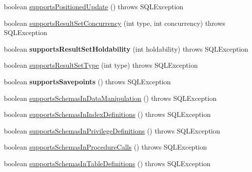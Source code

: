 \begin{DoxyCompactItemize}
\item 
boolean \mbox{\hyperlink{classcom_1_1mysql_1_1cj_1_1jdbc_1_1_database_meta_data_afe01b3d8023ed83aa4c67f786d47f412}{supports\+Positioned\+Update}} ()  throws S\+Q\+L\+Exception 
\item 
boolean \mbox{\hyperlink{classcom_1_1mysql_1_1cj_1_1jdbc_1_1_database_meta_data_a642e1d8dc7574859b8cfc640e889ff58}{supports\+Result\+Set\+Concurrency}} (int type, int concurrency)  throws S\+Q\+L\+Exception 
\item 
\mbox{\label{classcom_1_1mysql_1_1cj_1_1jdbc_1_1_database_meta_data_a97fe356d4a91c7e2f531253265a7f96b}} 
boolean {\bfseries supports\+Result\+Set\+Holdability} (int holdability)  throws S\+Q\+L\+Exception 
\item 
boolean \mbox{\hyperlink{classcom_1_1mysql_1_1cj_1_1jdbc_1_1_database_meta_data_a13385ceb5415ae88f636239293f88b8f}{supports\+Result\+Set\+Type}} (int type)  throws S\+Q\+L\+Exception 
\item 
\mbox{\label{classcom_1_1mysql_1_1cj_1_1jdbc_1_1_database_meta_data_a56697e6cabb6dce61efbeaa285d028fe}} 
boolean {\bfseries supports\+Savepoints} ()  throws S\+Q\+L\+Exception 
\item 
boolean \mbox{\hyperlink{classcom_1_1mysql_1_1cj_1_1jdbc_1_1_database_meta_data_a95949baa3d0b11c7517ef35911461e7b}{supports\+Schemas\+In\+Data\+Manipulation}} ()  throws S\+Q\+L\+Exception 
\item 
boolean \mbox{\hyperlink{classcom_1_1mysql_1_1cj_1_1jdbc_1_1_database_meta_data_a1d8b93342e0a95fc227bfa419e2c0b7d}{supports\+Schemas\+In\+Index\+Definitions}} ()  throws S\+Q\+L\+Exception 
\item 
boolean \mbox{\hyperlink{classcom_1_1mysql_1_1cj_1_1jdbc_1_1_database_meta_data_aaa0144bd121c66c86a85ffe09bcec41b}{supports\+Schemas\+In\+Privilege\+Definitions}} ()  throws S\+Q\+L\+Exception 
\item 
boolean \mbox{\hyperlink{classcom_1_1mysql_1_1cj_1_1jdbc_1_1_database_meta_data_ae5757f6fb29d98b0aeb09b6937530a48}{supports\+Schemas\+In\+Procedure\+Calls}} ()  throws S\+Q\+L\+Exception 
\item 
boolean \mbox{\hyperlink{classcom_1_1mysql_1_1cj_1_1jdbc_1_1_database_meta_data_a7f6bb978e28b5d5f67489e73b3ec9578}{supports\+Schemas\+In\+Table\+Definitions}} ()  throws S\+Q\+L\+Exception 
\item 

\end{DoxyCompactItemize}
